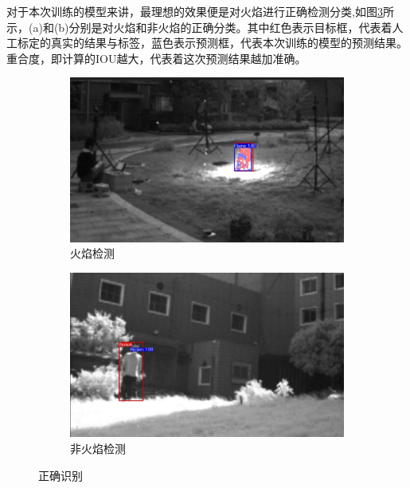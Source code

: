 对于本次训练的模型来讲，最理想的效果便是对火焰进行正确检测分类,如图\ref{20}所示，(a)和(b)分别是对火焰和非火焰的正确分类。其中红色表示目标框，代表着人工标定的真实的结果与标签，蓝色表示预测框，代表本次训练的模型的预测结果。重合度，即计算的IOU越大，代表着这次预测结果越加准确。
\begin{figure}[ht]
    \centering
    \begin{subfigure}{0.49\textwidth}
        \centering
        \includegraphics[width=\textwidth]{figures/jiance1.png}
        \caption{火焰检测}
        \label{20.a}
    \end{subfigure}
    \hfill
    \begin{subfigure}{0.49\textwidth}
        \centering
        \includegraphics[width=\textwidth]{figures/jiance8.png}
        \caption{非火焰检测}
        \label{20.b}
    \end{subfigure}
    \caption{正确识别}
    \label{20}
\end{figure}

